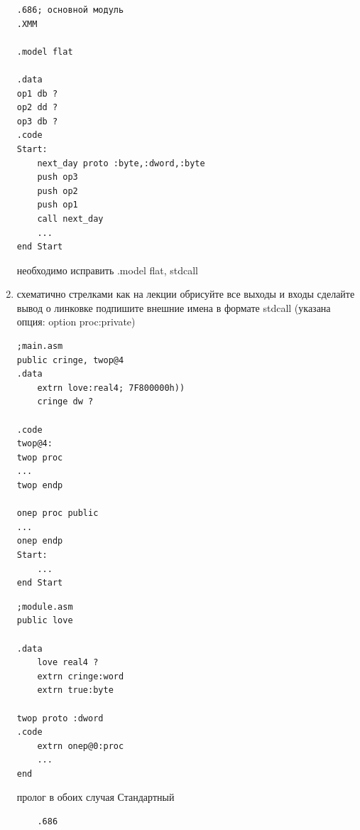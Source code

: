 \documentclass[a4paper,10pt]{article}
\begin{document}
\begin{enumerate}
\begin{verbatim}
.686; основной модуль
.XMM

.model flat

.data 
op1 db ?
op2 dd ?
op3 db ?
.code
Start:
    next_day proto :byte,:dword,:byte
    push op3
    push op2
    push op1
    call next_day
    ...
end Start
\end{verbatim}
необходимо исправить .model flat, stdcall
\newpage
    \item схематично стрелками как на лекции обрисуйте все выходы и входы сделайте вывод о линковке подпишите внешние имена в формате stdcall (указана опция: option proc:private)
\begin{multicols}{2}
\begin{verbatim}
;main.asm
public cringe, twop@4
.data
    extrn love:real4; 7F800000h))
    cringe dw ?
    
.code
twop@4:
twop proc
...
twop endp

onep proc public
...
onep endp
Start:
    ...
end Start
\end{verbatim}
\columnbreak
\begin{verbatim}
;module.asm
public love

.data
    love real4 ?
    extrn cringe:word
    extrn true:byte
    
twop proto :dword
.code
    extrn onep@0:proc
    ...
end
\end{verbatim}
\end{multicols}
пролог в обоих случая Стандартный\par
\begin{verbatim}
    .686
    

\end{verbatim}
\end{enumerate}
\end{document}
